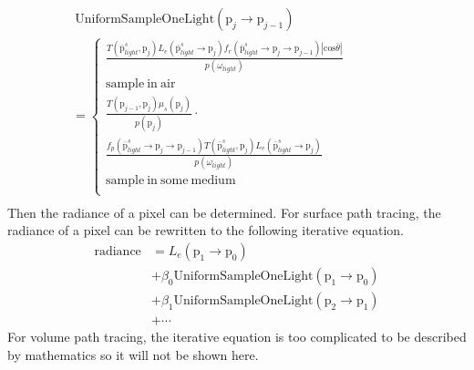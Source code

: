 \documentclass[acmtog]{acmart}
\def\w{\omega}
\def\p{\mathrm{p}}
\def\pp#1#2{\p_{#1}\rightarrow\p_{#2}}
\begin{document}
\begin{equation} \label{eq18}
	\begin{split}
		&\ \mathrm{UniformSampleOneLight}(\pp{j}{j-1})\\
		&=  \left\{\begin{aligned}
			\frac{T(\bar{\p}^s_{light},\p_j)L_e(\bar{\p}^s_{light}\rightarrow\p_j) f_r(\bar{\p}^s_{light}\rightarrow\p_j\rightarrow\p_{j-1})|\mathrm{cos}\bar{\theta}|}{p(\w_{light})}\\
			\mathrm{sample\ in\ air}\\
			\frac{T(\p_{j-1},\p_j)\mu_s(\p_j)}{p({\p_j})}\cdot\quad\quad\quad\quad\quad\quad\quad\quad\quad\quad\quad\quad\quad\quad\quad\quad\ \\
			\frac{f_p(\bar{\p}^s_{light}\rightarrow\p_j\rightarrow\p_{j-1})T(\bar{\p}^s_{light},\p_j)L_e(\bar{\p}^s_{light}\rightarrow\p_j)}{p(\w_{light})}\quad\quad\ \\
			\mathrm{sample\ in\ some\ medium}\\
		\end{aligned}\right.\\
	\end{split}
\end{equation}
Then the radiance of a pixel can be determined.
For surface path tracing, the radiance of a pixel can be rewritten to the following iterative equation.
\begin{equation} \label{eq19}
	\begin{split}
		\mathrm{radiance} &= L_e(\pp{1}{0})\\
		&+ \beta_0\mathrm{UniformSampleOneLight(\pp{1}{0})}\\
		&+ \beta_1\mathrm{UniformSampleOneLight(\pp{2}{1})}\\
		&+ \cdots
	\end{split}
\end{equation}
For volume path tracing, the iterative equation is too complicated to be described by mathematics so it will not be shown here.
\end{document}
